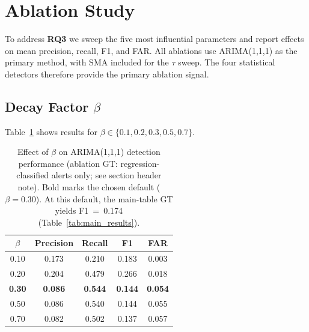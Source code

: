 \documentclass[a4paper,fleqn]{cas-sc}
\theoremstyle{plain}
\begin{document}
\section{Ablation Study}\label{sec:ablation}

\noindent{}

\medskip
To address \textbf{RQ3} we sweep the five most influential parameters and
report effects on mean precision, recall, F1, and FAR.
All ablations use ARIMA(1,1,1) as the primary method, with SMA included
for the $\tau$ sweep.
The four statistical detectors therefore provide the primary ablation signal.

\subsection{Decay Factor \texorpdfstring{$\beta$}{beta}}\label{sec:ablation:beta}

Table~\ref{tab:ablation_beta} shows results for $\beta \in \{0.1, 0.2, 0.3,
0.5, 0.7\}$.

\begin{table}[tbp]
\centering
\begin{tabular}{ccccc}
\toprule
$\beta$ & Precision & Recall & F1 & FAR \\
\midrule
0.10 & 0.173 & 0.210 & 0.183 & 0.003 \\
0.20 & 0.204 & 0.479 & 0.266 & 0.018 \\
\textbf{0.30} & \textbf{0.086} & \textbf{0.544} & \textbf{0.144} & \textbf{0.054} \\
0.50 & 0.086 & 0.540 & 0.144 & 0.055 \\
0.70 & 0.082 & 0.502 & 0.137 & 0.057 \\
\bottomrule
\end{tabular}
\caption{Effect of $\beta$ on ARIMA(1,1,1) detection performance
  (ablation GT: regression-classified alerts only; see section header note).
  Bold marks the chosen default ($\beta = 0.30$).
  At this default, the main-table GT yields F1~=~0.174 (Table~\ref{tab:main_results}).}
\label{tab:ablation_beta}
\end{table}
\end{document}
